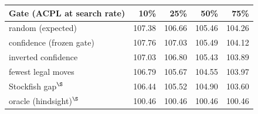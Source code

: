 \footnotesize\setlength{\tabcolsep}{4pt}\begin{tabular}{lrrrr}
\toprule
Gate (ACPL at search rate) & 10\% & 25\% & 50\% & 75\% \\
\midrule
random (expected) & 107.38 & 106.66 & 105.46 & 104.26 \\
confidence (frozen gate) & 107.76 & 107.03 & 105.49 & 104.12 \\
inverted confidence & 107.03 & 106.80 & 105.43 & 103.89 \\
fewest legal moves & 106.79 & 105.67 & 104.55 & 103.97 \\
Stockfish gap$^{\S}$ & 106.44 & 105.52 & 104.90 & 103.60 \\
oracle (hindsight)$^{\S}$ & 100.46 & 100.46 & 100.46 & 100.46 \\
\bottomrule
\end{tabular}
